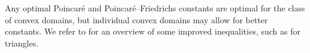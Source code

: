 \documentclass[10pt,letterpaper]{article}
\newcommand{\notice}[1]{{\color{red}REMARK: #1}}
\begin{document}
\begin{remark}
\end{remark}


\begin{remark}
    Any optimal Poincar\'e and Poincar\'e--Friedrichs constants are optimal for the class of convex domains, 
    but individual convex domains may allow for better constants.
    We refer to \cite{matculevich2016explicit} for an overview of some improved inequalities, such as for triangles.
\end{remark}


\end{document}
